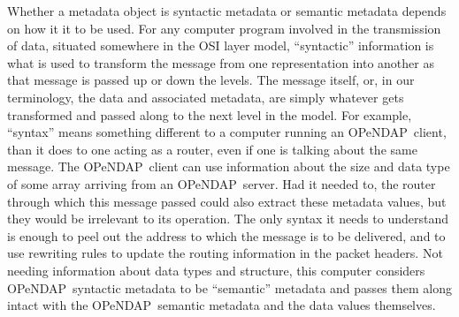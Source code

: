 \documentclass{codata}
\newcommand{\opendap}{\ac{OPeNDAP}}
\begin{document}
Whether a metadata object is syntactic metadata or semantic metadata 
depends on how it it to be used. 
For any computer program involved in the transmission of data,
situated somewhere in the OSI layer model, ``syntactic'' information
is what is used to transform the message from one representation into
another as that message is passed up or down the levels.  The message
itself, or, in our terminology, the data and associated metadata, are
simply whatever gets transformed and passed along to the next level in
the model.  For example, 
%
%
``syntax'' means something different to a computer running an
\opendap\ client, than it does to one acting as a router, even if one
is talking about the same message.  The \opendap\ client can use
information about the size and data type of some array arriving from
an \opendap\ server.  Had it needed to, the router through which this
message passed could also extract these metadata values, but they
would be irrelevant to its operation.  The only syntax it needs to
understand is enough to peel out the address to which the message is
to be delivered, and to use rewriting rules to update the routing
information in the packet headers.  Not needing information about data
types and structure, this computer considers \opendap\ syntactic metadata 
to be ``semantic'' metadata and passes them along intact with the
\opendap\ semantic metadata and the data values themselves.
\end{document}

